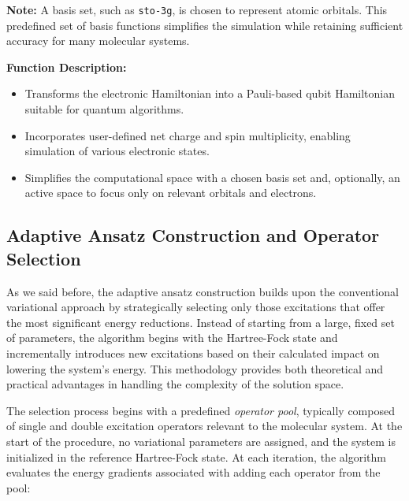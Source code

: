 \begin{enumerate}
    \noindent\textbf{Note:}
    A basis set, such as \texttt{sto-3g}, is chosen to represent atomic orbitals. This predefined set of basis functions simplifies the simulation while retaining sufficient accuracy for many molecular systems.

    \noindent\textbf{Function Description:}
    \begin{itemize}
        \item Transforms the electronic Hamiltonian into a Pauli-based qubit Hamiltonian suitable for quantum algorithms.
        \item Incorporates user-defined net charge and spin multiplicity, enabling simulation of various electronic states.
        \item Simplifies the computational space with a chosen basis set and, optionally, an active space to focus only on relevant orbitals and electrons.
    \end{itemize}

\end{enumerate}


\subsection{Adaptive Ansatz Construction and Operator Selection}

As we said before, the adaptive ansatz construction builds upon the conventional variational approach by strategically selecting only those excitations that offer the most significant energy reductions. Instead of starting from a large, fixed set of parameters, the algorithm begins with the Hartree-Fock state and incrementally introduces new excitations based on their calculated impact on lowering the system’s energy. This methodology provides both theoretical and practical advantages in handling the complexity of the solution space.

The selection process begins with a predefined \textit{operator pool}, typically composed of single and double excitation operators relevant to the molecular system. At the start of the procedure, no variational parameters are assigned, and the system is initialized in the reference Hartree-Fock state. At each iteration, the algorithm evaluates the energy gradients associated with adding each operator from the pool:

